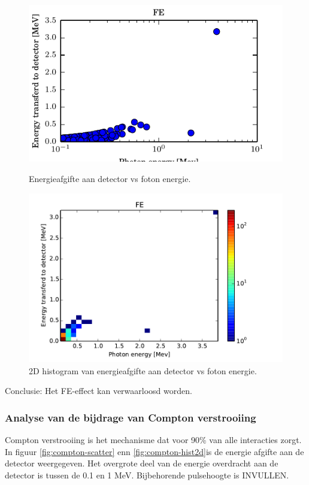 \documentclass[a4paper,11pt]{article}
\begin{document}
\begin{figure}[t]
  \begin{center}
    \includegraphics{fig-fe-scatter.pdf}
    \caption{\label{fig:fe-scatter} Energieafgifte aan detector vs foton energie.}
  \end{center}
  \begin{center}
    \includegraphics{fig-fe-hist2d.pdf}
    \caption{\label{fig:fe-hist2d} 2D histogram van energieafgifte aan detector vs foton energie.}
  \end{center}
\end{figure}

Conclusie: Het FE-effect kan verwaarloosd worden.

\subsubsection{Analyse van de bijdrage van Compton verstrooiing}
Compton verstrooiing is het mechanisme dat voor 90\% van alle interacties zorgt. In figuur \ref{fig:compton-scatter} enn \ref{fig:compton-hist2d}is de energie afgifte aan de detector weergegeven. Het overgrote deel van de energie overdracht aan de detector is tussen de 0.1 en 1 MeV. Bijbehorende pulsehoogte is INVULLEN.
\end{document}
